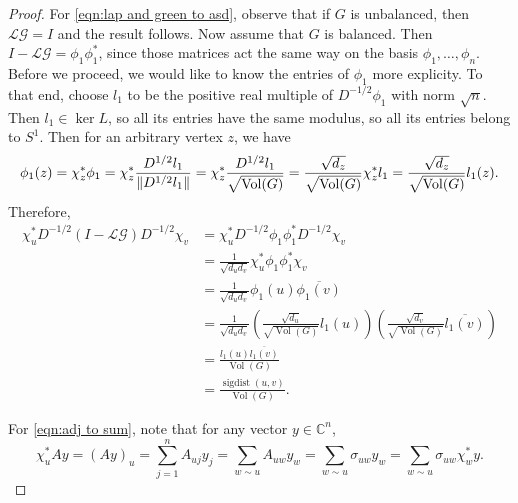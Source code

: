 \documentclass[12pt]{article}
\theoremstyle{definition}
\newcommand{\C}{\mathbb C}
\DeclarePairedDelimiter\norm{\lVert}{\rVert}
\DeclareMathOperator{\sigdist}{sigdist}
\DeclareMathOperator{\vol}{Vol}
\newcommand{\lap}{\mathcal{L}}
\newcommand{\green}{\mathcal{G}}
\begin{document}
\begin{proof}
For \cref{eqn:lap and green to asd}, observe that if $G$ is unbalanced, then $\lap \green = I$ and the result follows. Now assume that $G$ is balanced. Then $I - \lap \green = \phi_1 \phi_1^*$, since those matrices act the same way on the basis $\phi_1, \dots, \phi_n$. Before we proceed, we would like to know the entries of $\phi_1$ more explicity. To that end, choose $l_1$ to be the positive real multiple of $D^{-1/2} \phi_1$  with norm $\sqrt{n}$. Then $l_1 \in \ker L$, so all its entries have the same modulus, so all its entries belong to $S^1$. Then for an arbitrary vertex $z$, we have
$$
\phi_1(z)
= \chi_z^* \phi_1
= \chi_z^* \frac{D^{1/2} l_1}{\norm{D^{1/2} l_1}} 
= \chi_z^* \frac{D^{1/2} l_1}{\sqrt{\vol(G)}}
= \frac{\sqrt{d_z}}{\sqrt{\vol(G)}} \chi_z^* l_1
= \frac{\sqrt{d_z}}{\sqrt{\vol(G)}} l_1(z).
$$  
Therefore,
\begin{align*}
\chi_u^* D^{-1/2} (I - \lap \green) D^{-1/2} \chi_v
&= \chi_u^* D^{-1/2} \phi_1 \phi_1^* D^{-1/2} \chi_v \\
&= \frac{1}{\sqrt{d_u d_v}} \chi_u^* \phi_1 \phi_1^* \chi_v \\
&= \frac{1}{\sqrt{d_u d_v}} \phi_1(u) \overline{\phi_1(v)} \\
&= \frac{1}{\sqrt{d_u d_v}} \left( \frac{\sqrt{d_u}}{\sqrt{\vol(G)}} l_1(u) \right) \left( \frac{\sqrt{d_v}}{\sqrt{\vol(G)}} \overline{l_1(v)} \right) \\
&= \frac{l_1(u) \overline{l_1(v)}}{\vol(G)} \\
&= \frac{\sigdist(u, v)}{\vol(G)}.
\end{align*}

For \cref{eqn:adj to sum}, note that for any vector $y \in \C^n$, 
$$
\chi_u^* A y = (A y)_{u} = \sum_{j=1}^n A_{uj} y_j = \sum_{w \sim u} A_{uw} y_w = \sum_{w \sim u} \sigma_{uw} y_w = \sum_{w \sim u} \sigma_{uw} \chi^*_w y.
$$
\end{proof}
\end{document}
